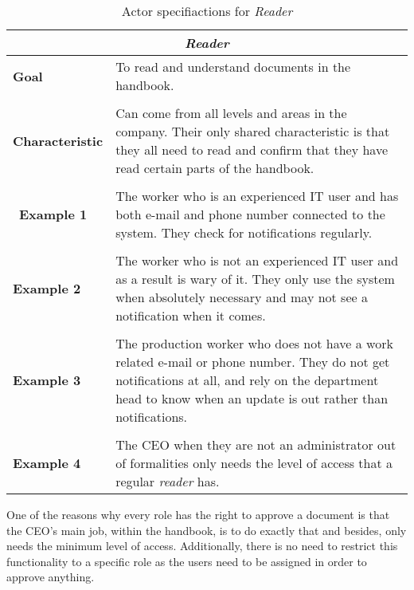 \begin{table}[H]
	\centering
	\begin{tabular}{l p{11.3cm}}
		\hline
		\multicolumn{2}{c}{\textbf{\textit{Reader}}}\\
		\hline

		\textbf{Goal} & To read and understand documents in the handbook. \\
		&  \\

		\textbf{Characteristic} & Can come from all levels and areas in the company.
		Their only shared characteristic is that they all need to read and confirm that they have read certain parts of the handbook.\\
		&  \\
		\
		\textbf{Example 1}
		& The worker who is an experienced IT user and has both e-mail and phone number connected to the system.
		They check for notifications regularly.\\
		&  \\

		\textbf{Example 2}
		& The worker who is not an experienced IT user and as a result is wary of it.
		They only use the system when absolutely necessary and may not see a notification when it comes.\\

		&  \\
		\textbf{Example 3}
		& The production worker who does not have a work related e-mail or phone number.
		They do not get notifications at all, and rely on the department head to know when an update is out rather than notifications.\\
		&  \\

		\textbf{Example 4}
		& The CEO when they are not an administrator out of formalities only needs the level of access that a regular \textit{reader} has.\\
		\hline
	\end{tabular}
	\caption{Actor specifiactions for \textit{Reader}}\label{tab:Actor-reader}
\end{table}

One of the reasons why every role has the right to approve a document is that the CEO's main job, within the handbook, is to do exactly that and besides, only needs the minimum level of access.
Additionally, there is no need to restrict this functionality to a specific role as the users need to be assigned in order to approve anything.
